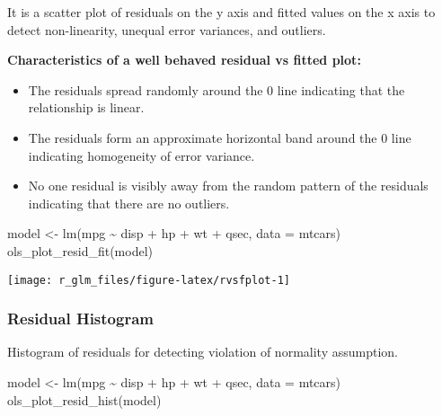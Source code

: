 \documentclass[
]{article}
\newenvironment{Shaded}{\begin{snugshade}}{\end{snugshade}}
\newcommand{\AttributeTok}[1]{\textcolor[rgb]{0.77,0.63,0.00}{#1}}
\newcommand{\FunctionTok}[1]{\textcolor[rgb]{0.00,0.00,0.00}{#1}}
\newcommand{\NormalTok}[1]{#1}
\newcommand{\OtherTok}[1]{\textcolor[rgb]{0.56,0.35,0.01}{#1}}
\newcommand{\SpecialCharTok}[1]{\textcolor[rgb]{0.00,0.00,0.00}{#1}}
\providecommand{\tightlist}{%
  \setlength{\itemsep}{0pt}\setlength{\parskip}{0pt}}
\begin{document}
It is a scatter plot of residuals on the y axis and fitted values on the
x axis to detect non-linearity, unequal error variances, and outliers.

\textbf{Characteristics of a well behaved residual vs fitted plot:}

\begin{itemize}
\tightlist
\item
  The residuals spread randomly around the 0 line indicating that the
  relationship is linear.
\item
  The residuals form an approximate horizontal band around the 0 line
  indicating homogeneity of error variance.
\item
  No one residual is visibly away from the random pattern of the
  residuals indicating that there are no outliers.
\end{itemize}

\begin{Shaded}
\begin{Highlighting}[]
\NormalTok{model }\OtherTok{\textless{}{-}} \FunctionTok{lm}\NormalTok{(mpg }\SpecialCharTok{\textasciitilde{}}\NormalTok{ disp }\SpecialCharTok{+}\NormalTok{ hp }\SpecialCharTok{+}\NormalTok{ wt }\SpecialCharTok{+}\NormalTok{ qsec, }\AttributeTok{data =}\NormalTok{ mtcars)}
\FunctionTok{ols\_plot\_resid\_fit}\NormalTok{(model)}
\end{Highlighting}
\end{Shaded}

\begin{center}\texttt{[image: r\_glm\_files/figure-latex/rvsfplot-1]} \end{center}

\hypertarget{residual-histogram}{%
\subsubsection{Residual Histogram}\label{residual-histogram}}

Histogram of residuals for detecting violation of normality assumption.

\begin{Shaded}
\begin{Highlighting}[]
\NormalTok{model }\OtherTok{\textless{}{-}} \FunctionTok{lm}\NormalTok{(mpg }\SpecialCharTok{\textasciitilde{}}\NormalTok{ disp }\SpecialCharTok{+}\NormalTok{ hp }\SpecialCharTok{+}\NormalTok{ wt }\SpecialCharTok{+}\NormalTok{ qsec, }\AttributeTok{data =}\NormalTok{ mtcars)}
\FunctionTok{ols\_plot\_resid\_hist}\NormalTok{(model)}
\end{Highlighting}
\end{Shaded}
\end{document}
